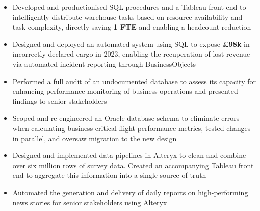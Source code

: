\begin{paracol}{2}
\begin{itemize}

\medskip
{}

\end{itemize}

\divider

\begin{itemize}
\item Developed and productionised SQL procedures and a Tableau front end to intelligently distribute warehouse tasks based on resource availability and task complexity, directly saving \textbf{1 FTE} and enabling a headcount reduction
\item Designed and deployed an automated system using SQL to expose \textbf{£98k} in incorrectly declared cargo in 2023, enabling the recuperation of lost revenue via automated incident reporting through BusinessObjects
\item Performed a full audit of an undocumented database to assess its capacity for enhancing performance monitoring of business operations and presented findings to senior stakeholders
\item Scoped and re-engineered an Oracle database schema to eliminate errors when calculating business-critical flight performance metrics, tested changes in parallel, and oversaw migration to the new design

\medskip
{}

\end{itemize}

\divider

\begin{itemize}
\item Designed and implemented data pipelines in Alteryx to clean and combine over six million rows of survey data. Created an accompanying Tableau front end to aggregate this information into a single source of truth
\item Automated the generation and delivery of daily reports on high-performing news stories for senior stakeholders using Alteryx


\end{itemize}
\end{paracol}
